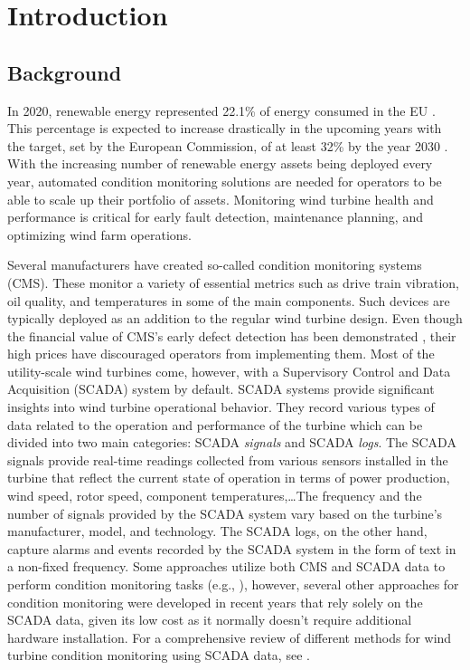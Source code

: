\chapter{Introduction}
\label{chap:intro}
\minitoc

\section{Background}
In 2020, renewable energy represented 22.1\% of energy consumed in the EU \cite{Renewable_energy_statistics}. This percentage is 
expected to increase drastically in the upcoming years with the target, set by
the European Commission, of at least 32\% by the year 2030 \cite{Renewable_energy_targets}. With the increasing number
of renewable energy assets being deployed every year, automated condition monitoring
solutions are needed for operators to be able to scale up their portfolio of assets.
Monitoring wind turbine health and performance is critical for early fault detection, maintenance planning, and 
optimizing wind farm operations. 
\par Several manufacturers have created so-called condition monitoring systems (CMS). 
These monitor a variety of essential metrics such as drive train vibration, oil quality, and temperatures in some of 
the main components. Such devices are typically deployed as an addition to the regular wind turbine design.
Even though the financial value of CMS's early defect detection has been demonstrated \cite{CMS}, 
their high prices \cite{CMS_Costs} have discouraged operators from implementing them.
Most of the utility-scale wind turbines come, however, with a Supervisory Control and Data Acquisition (SCADA) system by default.
SCADA systems provide significant insights into wind turbine operational behavior. 
They record various types of data related to 
the operation and performance of the turbine which can be divided into two main categories: SCADA \emph{signals} and SCADA \emph{logs}.
The SCADA signals provide real-time readings collected from various sensors installed in the turbine that reflect the current state of operation 
in terms of power production, wind speed, rotor speed, component temperatures,\dots The frequency and the number of signals provided by the SCADA system 
vary based on the turbine's manufacturer, model, and technology. The SCADA logs, on the other hand, capture alarms and events recorded by the SCADA 
system in the form of text in a non-fixed frequency.
Some approaches utilize both CMS and SCADA data to perform condition monitoring tasks (e.g., \cite{CMSSCADA}), however, 
several other approaches for condition monitoring were developed in recent years that rely solely on the
SCADA data, given its low cost as it normally doesn't require additional hardware installation. For a comprehensive review 
of different methods for wind turbine condition monitoring using SCADA data, see \cite{SCADA_NBM_Review}.

